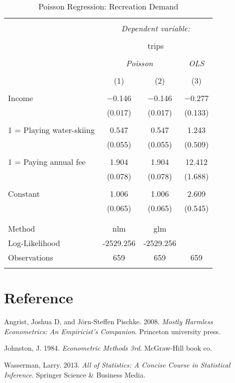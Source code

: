 \documentclass[
  12pt,
]{article}
\newlength{\cslhangindent}
\newenvironment{cslreferences}%
  {\setlength{\parindent}{0pt}%
  \everypar{\setlength{\hangindent}{\cslhangindent}}\ignorespaces}%
  {\par}
\begin{document}
\begin{table}[t] \centering 
  \caption{Poisson Regression: Recreation Demand} 
  \label{recreation} 
\begin{tabular}{@{\extracolsep{5pt}}lccc} 
\\[-1.8ex]\hline 
\hline \\[-1.8ex] 
 & \multicolumn{3}{c}{\textit{Dependent variable:}} \\ 
\cline{2-4} 
\\[-1.8ex] & \multicolumn{3}{c}{trips} \\ 
\\[-1.8ex] & \multicolumn{2}{c}{\textit{Poisson}} & \textit{OLS} \\ 
\\[-1.8ex] & (1) & (2) & (3)\\ 
\hline \\[-1.8ex] 
 Income & $-$0.146 & $-$0.146 & $-$0.277 \\ 
  & (0.017) & (0.017) & (0.133) \\ 
  & & & \\ 
 1 = Playing water-skiing & 0.547 & 0.547 & 1.243 \\ 
  & (0.055) & (0.055) & (0.509) \\ 
  & & & \\ 
 1 = Paying annual fee & 1.904 & 1.904 & 12.412 \\ 
  & (0.078) & (0.078) & (1.688) \\ 
  & & & \\ 
 Constant & 1.006 & 1.006 & 2.609 \\ 
  & (0.065) & (0.065) & (0.545) \\ 
  & & & \\ 
\hline \\[-1.8ex] 
Method & nlm & glm &  \\ 
Log-Likelihood & -2529.256 & -2529.256 &  \\ 
Observations & 659 & 659 & 659 \\ 
\hline 
\hline \\[-1.8ex] 
\end{tabular} 
\end{table}

\hypertarget{reference}{%
\section{Reference}\label{reference}}

\hypertarget{refs}{}
\begin{cslreferences}
\leavevmode\hypertarget{ref-angrist2008mostly}{}%
Angrist, Joshua D, and Jörn-Steffen Pischke. 2008. \emph{Mostly Harmless Econometrics: An Empiricist's Companion}. Princeton university press.

\leavevmode\hypertarget{ref-johnston1984econometric}{}%
Johnston, J. 1984. \emph{Econometric Methods 3rd}. McGraw-Hill book co.

\leavevmode\hypertarget{ref-wasserman2013all}{}%
Wasserman, Larry. 2013. \emph{All of Statistics: A Concise Course in Statistical Inference}. Springer Science \& Business Media.
\end{cslreferences}
\end{document}
